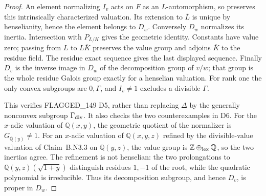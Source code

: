 \begin{proof}
An element normalizing $I_v$ acts on $F$ as an $L$-automorphism, so
preserves this intrinsically characterized valuation.  Its extension
to $\overline L$ is unique by henselianity, hence the element belongs
to $D_w$.  Conversely $D_w$ normalizes its inertia.  Intersection with
$P_{L/K}$ gives the geometric identity.  Constants have value zero;
passing from $L$ to $L\overline K$ preserves the value group and
adjoins $\overline K$ to the residue field.  The residue exact
sequence gives the last displayed sequence.  Finally $D_v$ is the
inverse image in $D_w$ of the decomposition group of $v/w$; that
group is the whole residue Galois group exactly for a henselian
valuation.  For rank one the only convex subgroups are $0,\Gamma$,
and $I_v\ne1$ excludes a divisible $\Gamma$.

This verifies FLAGGED\_149 D5, rather than replacing $\Delta$ by
the generally nonconvex subgroup $\Gamma_{\rm div}$.  It also checks
the two counterexamples in D6.  For the $x$-adic valuation of
$\mathbb Q(x,y)$, the geometric quotient of the normalizer is
$G_{\overline{\mathbb Q}(y)}\ne1$.  For an $x$-adic valuation of
$\mathbb Q(x,y,z)$ refined by the divisible-value valuation of
Claim~B.N3.3 on $\mathbb Q(y,z)$, the value group is
$\mathbb Z\oplus_{\rm lex}\mathbb Q$, so the two inertias agree.
The refinement is not henselian: the two prolongations to
$\mathbb Q(y,z)(\sqrt{1+y})$ distinguish residues $1,-1$ of the
root, while the quadratic polynomial is irreducible.  Thus its
decomposition subgroup, and hence $D_v$, is proper in $D_w$.
\end{proof}

